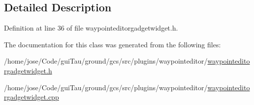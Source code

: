 \subsection{Detailed Description}


Definition at line 36 of file waypointeditorgadgetwidget.\-h.



The documentation for this class was generated from the following files\-:\begin{DoxyCompactItemize}
\item 
/home/jose/\-Code/gui\-Tau/ground/gcs/src/plugins/waypointeditor/\hyperlink{waypointeditorgadgetwidget_8h}{waypointeditorgadgetwidget.\-h}\item 
/home/jose/\-Code/gui\-Tau/ground/gcs/src/plugins/waypointeditor/\hyperlink{waypointeditorgadgetwidget_8cpp}{waypointeditorgadgetwidget.\-cpp}\end{DoxyCompactItemize}
